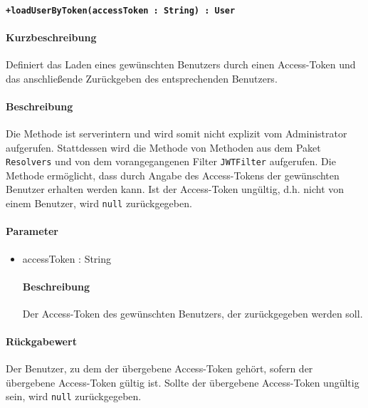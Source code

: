 \paragraph*{\texttt{+loadUserByToken(accessToken : String) : User}}%
\paragraph*{Kurzbeschreibung}
Definiert das Laden eines gewünschten Benutzers durch einen Access-Token und das anschließende Zurückgeben des entsprechenden Benutzers.
\paragraph*{Beschreibung}
Die Methode ist serverintern und wird somit nicht explizit vom Administrator aufgerufen.
Stattdessen wird die Methode von Methoden aus dem Paket \texttt{Resolvers} und von dem vorangegangenen Filter \texttt{JWTFilter} aufgerufen.
Die Methode ermöglicht, dass durch Angabe des Access-Tokens der gewünschten Benutzer erhalten werden kann. 
Ist der Access-Token ungültig, d.h. nicht von einem Benutzer, wird \texttt{null} zurückgegeben.
\paragraph*{Parameter}
\begin{itemize}
    \item accessToken : String
    		\paragraph*{Beschreibung}
    		Der Access-Token des gewünschten Benutzers, der zurückgegeben werden soll.
\end{itemize}
\paragraph*{Rückgabewert}
Der Benutzer, zu dem der übergebene Access-Token gehört, sofern der übergebene Access-Token gültig ist.
Sollte der übergebene Access-Token ungültig sein, wird \texttt{null} zurückgegeben.
